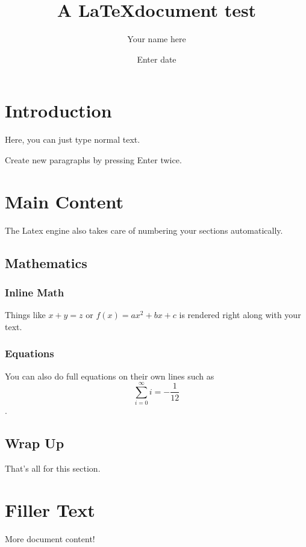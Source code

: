 \documentclass[11pt,letterpaper]{article}
\author{Your name here}
\date{Enter date}
\title{A \LaTeX document test}
\begin{document}
\maketitle
\newpage

\tableofcontents
\newpage

\section{Introduction}
Here, you can just type normal text.

Create new paragraphs by pressing Enter twice.
\newpage

\section{Main Content}
The Latex engine also takes care of numbering your sections automatically. 

    \subsection{Mathematics}

        \subsubsection{Inline Math}

        Things like $x+y = z$ or $f(x)=ax^2 + bx + c$ is rendered right along with your text.

        \subsubsection{Equations}
        You can also do full equations on their own lines such as $$ \sum_{i=0}^\infty i = -\frac{1}{12} $$.

    \subsection{Wrap Up}
    That's all for this section.


\section{Filler Text}
More document content!
\end{document}
